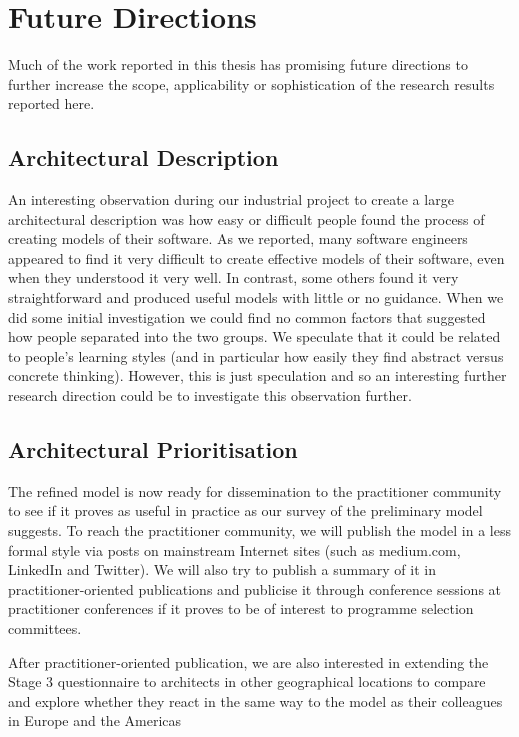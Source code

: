 \section{Future Directions}

Much of the work reported in this thesis has promising future directions to further increase the scope, applicability or sophistication of the research results reported here.

\subsection{Architectural Description}

An interesting observation during our industrial project to create a large architectural description was how easy or difficult people found the process of creating models of their software.  As we reported, many software engineers appeared to find it very difficult to create effective models of their software, even when they understood it very well.  In contrast, some others found it very straightforward and produced useful models with little or no guidance.  When we did some initial investigation we could find no common factors that suggested how people separated into the two groups.  We speculate that it could be related to people's learning styles (and in particular how easily they find abstract versus concrete thinking).  However, this is just speculation and so an interesting further research direction could be to investigate this observation further.

\subsection{Architectural Prioritisation}

The refined model is now ready for dissemination to the practitioner community to see if it proves as useful in practice as our survey of the preliminary model suggests.  To reach the practitioner community, we will publish the model in a less formal style via posts on mainstream Internet sites (such as medium.com, LinkedIn and Twitter).  We will also try to publish a summary of it in practitioner-oriented publications and publicise it through conference sessions at practitioner conferences if it proves to be of interest to programme selection committees.

After practitioner-oriented publication, we are also interested in extending the Stage 3 questionnaire to architects in other geographical locations to compare and explore whether they react in the same way to the model as their colleagues in Europe and the Americas

